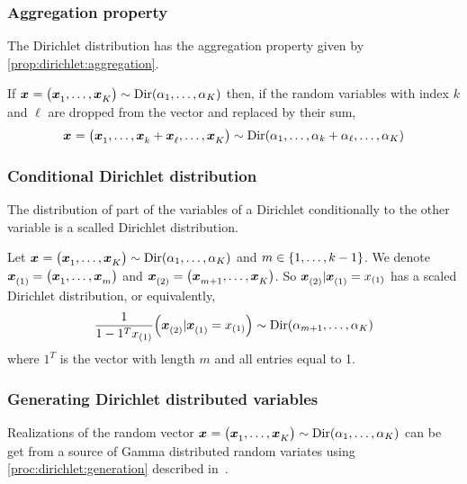 \subsubsection{Aggregation property}


The Dirichlet distribution has the aggregation property given by \cref{prop:dirichlet:aggregation}.

\begin{prop}\label{prop:dirichlet:aggregation}
  If $\va x=\bracket{\va x_1,\ldots,\va x_K}\sim \Dir\bracket{\alpha_1,\ldots,\alpha_K}$ then, if the random variables with index $k$ and $\ell$ are dropped from the vector and replaced by their sum,
  $$\va x=\bracket{\va x_1,\ldots,\va x_k+\va x_{\ell},\ldots,\va x_K}\sim \Dir\bracket{\alpha_1,\ldots,\alpha_k+\alpha_{\ell},\ldots,\alpha_K}$$
\end{prop}


\subsubsection{Conditional Dirichlet distribution}


The distribution of part of the variables of a Dirichlet conditionally to the other variable is a scalled Dirichlet distribution.


\begin{prop}\label{prop:dirichlet:conditional}
  Let $\va x=\bracket{\va x_1,\ldots,\va x_K}\sim \Dir\bracket{\alpha_1,\ldots,\alpha_K}$ and $m\in\range[1]{k-1}$.
  We denote $\va x_{(1)}=\bracket{\va x_1,\ldots,\va x_m}$ and $\va x_{(2)}=\bracket{\va x_{m+1},\ldots,\va x_K}$.
  So $\va x_{(2)}|\va x_{(1)}=x_{(1)}$ has a scaled Dirichlet distribution, or equivalently,
  $$
  \frac{1}{1-1^T x_{(1)}} \bracket{\va x_{(2)}|\va x_{(1)}=x_{(1)}}
  \sim
  \Dir\bracket{\alpha_{m+1},\ldots,\alpha_K}
  $$
  where $1^T$ is the vector with length $m$ and all entries equal to 1.
\end{prop}




\subsubsection{Generating Dirichlet distributed variables}


Realizations of the random vector $\va x=\bracket{\va x_1,\ldots,\va x_K}\sim\Dir\bracket{\alpha_1,\ldots,\alpha_K}$ can be get from a source of Gamma distributed random variates using \cref{proc:dirichlet:generation} described in~\cite{Frigyik2010}.


